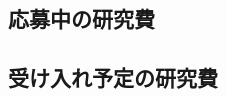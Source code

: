 \documentclass[11pt,a4paper,twoside]{jarticle}
\newcommand{\研究種別}{B}	%
\newcommand{\研究課題名}{コ・クリエイティブなソフトウェア開発者を育成するPBL型教育}
\newcommand{\研究機関名}{産業技術大学院大学}
\newcommand{\研究代表者氏名}{中鉢　欣秀}
\newcommand{\研究代表者氏名ふりがな}{ちゅうばち　よしひで}
\newcommand{\本応募effort}{\KLEffort{18}}	%
\newcommand{\研究期間の最終元号年度}{27}	%
\begin{document}
\subsection{応募中の研究費}
\newcommand{\本人の研究経費}{%
	\KLMyBudget{2045}{4905}%
}

\newcommand{\応募中の研究費}{%
		
}

\subsection{受け入れ予定の研究費}
\newcommand{\受け入れ予定の研究費}{%
}





\end{document}
